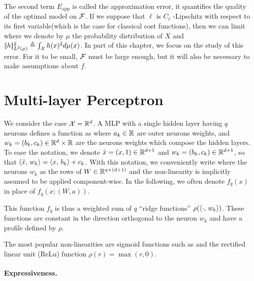 The second term $ E_{\text{app}} $ is called the approximation error, it quantifies the quality of the optimal model on $ \mathcal{F} $. If we suppose that $\ell$ is $C_\ell$ -Lipschitz with respect to its first variable(which is the case for classical cost functions), then we can limit
where we denote by $\mu$ the probability distribution of $X$ and $|\!| h |\!|^2_{L^2(\mu)}\triangleq \int_{\mathcal{X}} h(x)^2 d \mu(x) $.
%
In part of this chapter, we focus on the study of this error. For it to be small, $\mathcal{F}$ must be large enough, but it will also be necessary to make assumptions about $f$. 
 

\section{Multi-layer Perceptron}

We consider the case $\mathcal{X}=\mathbb{R}^d$. 
%
A MLP with a single hidden layer having $q$ neurons defines a function as
where $a_k \in \mathbb{R}$ are outer neurons weights, and $w_k = (b_k,c_k) \in \mathbb{R}^{d} \times \mathbb{R}$ are the neurons weights which compose the hidden layers.
%
To ease the notation, we denote $\bar x = (x,1) \in \mathbb{R}^{d+1}$ and $w_k=(b_k,c_k) \in \mathbb{R}^{d+1}$, so that $\langle \bar x,\,w_k\rangle = \langle x,\,b_k\rangle+c_k$. With this notation, we conveniently write
where the neurons $w_k$ as the rows of $W \in \mathbb{R}^{q \times (d+1)}$ and the non-linearity is implicitly assumed to be applied component-wise. In the following, we often denote $f_q(x)$ in place of $f_q(x ; (W,a))$.

This function $f_q$ is thus a weighted sum of $q$ ``ridge functions'' $\rho(\langle \cdot,\,w_k\rangle)$. These functions are constant in the direction orthogonal to the neuron $w_k$ and have a profile defined by $\rho$.

The most popular non-linearities are sigmoid functions such as
and the rectified linear unit (ReLu) function $\rho(r)=\max(r,0)$.

\paragraph{Expressiveness. }

